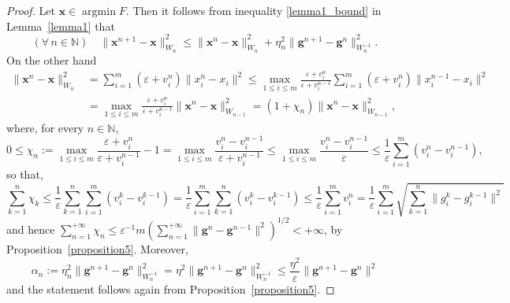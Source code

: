 \documentclass[11pt]{article}
\theoremstyle{plain}
\theoremstyle{definition}
\theoremstyle{remark}
\newcommand{\norm}[1]{\lVert{#1}\rVert}
\DeclareMathOperator*{\argmin}{argmin}
\newcommand{\x}{x}
\newcommand{\bx}{\bm{x}}
\newcommand{\buu}{\bm{g}}
\newcommand{\uu}{g}
\newcommand{\iter}{n}
\newcommand{\ite}{k}
\newcommand{\N}{\mathbb{N}}
\newcommand{\W}{W}
\begin{document}
\begin{proof}
Let $\bx\in \argmin F$. Then it follows from inequality \eqref{lemma1_bound} in Lemma~\ref{lemma1} that
\begin{equation*}
(\forall\,\iter\in \N)\quad
\norm{\bx^{\iter+1} - \bx}_{\W_\iter}^2\leq \norm{\bx^\iter - \bx}_{\W_\iter}^2+ \eta_\iter^2 \norm{\buu^{\iter+1} - \buu^{\iter}}_{\W_\iter^{-1}}^2.
\end{equation*}
On the other hand
\begin{align*}
\norm{\bx^\iter - \bx}_{\W_\iter}^2 &= \sum_{i=1}^m (\varepsilon + v_i^\iter) \norm{\x_i^\iter- \x_i}^2
\leq \max_{1\leq i\leq m}\frac{\varepsilon + v_i^{\iter}}{\varepsilon + v_i^{\iter-1}}\sum_{i=1}^m (\varepsilon + v_i^\iter) \norm{\x_i^{\iter-1}- \x_i}^2\\[1ex]
& = \max_{1\leq i\leq m}\frac{\varepsilon + v_i^{\iter}}{\varepsilon + v_i^{\iter-1}}\norm{\bx^\iter - \bx}_{\W_{\iter-1}}^2 = (1+\chi_\iter)\norm{\bx^\iter - \bx}_{\W_{\iter-1}}^2,
\end{align*}
where, for every $\iter\in \N$, 
\begin{equation*}
0\leq \chi_\iter := \max_{1\leq i\leq m}\frac{\varepsilon + v_i^{\iter}}{\varepsilon + v_i^{\iter-1}}- 1
= \max_{1\leq i\leq m} \frac{v_i^{\iter} - v_i^{\iter-1}}{\varepsilon + v_i^{\iter-1}} \leq \max_{1\leq i\leq m} \frac{v_i^{\iter} - v_i^{\iter-1}}{\varepsilon} \leq \frac{1}{\varepsilon}\sum_{i=1}^m (v_i^{\iter} - v_i^{\iter-1}),
\end{equation*}
so that, 
\begin{equation*}
\sum_{\ite=1}^{\iter} \chi_\ite \leq \frac{1}{\varepsilon}\sum_{\ite=1}^{\iter} \sum_{i=1}^m(v_i^{\ite} - v_i^{\ite-1}) = \frac{1}{\varepsilon}\sum_{i=1}^m \sum_{\ite=1}^{\iter} (v_i^{\ite} - v_i^{\ite-1})\leq \frac{1}{\varepsilon} \sum_{i=1}^m v_i^\iter = \frac{1}{\varepsilon}\sum_{i=1}^{m} \sqrt{\sum_{\ite=1}^{\iter} \norm{\uu_i^{\ite}-\uu_i^{\ite-1}}^2}
\end{equation*}
and hence
$\sum_{\iter=1}^{+\infty} \chi_\iter \leq \varepsilon^{-1}m (\sum_{\iter=1}^{+\infty} \norm{\buu^{\iter}-\buu^{\iter-1}}^2)^{1/2}<+\infty$, by Proposition~\ref{proposition5}. Moreover,
\begin{equation*}
\alpha_\iter:=\eta_\iter^2 \norm{\buu^{\iter+1} - \buu^{\iter}}_{\W_\iter^{-1}}^2 = \eta^2 \norm{\buu^{\iter+1} - \buu^{\iter}}_{\W_\iter^{-1}}^2 \leq \frac{\eta^2}{\varepsilon} \norm{\buu^{\iter+1} - \buu^{\iter}}^2
\end{equation*}
and the statement follows again from Proposition~\ref{proposition5}.
\end{proof}
\end{document}
